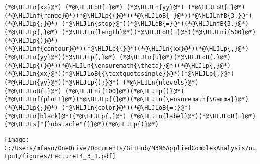 \documentclass[12pt,landscape]{article}
\newcommand{\HLJLn}[1]{#1}
\newcommand{\HLJLnf}[1]{\textcolor[RGB]{66,102,213}{#1}}
\newcommand{\HLJLs}[1]{\textcolor[RGB]{201,61,57}{#1}}
\newcommand{\HLJLnfB}[1]{\textcolor[RGB]{59,151,46}{#1}}
\newcommand{\HLJLni}[1]{\textcolor[RGB]{59,151,46}{#1}}
\newcommand{\HLJLoB}[1]{\textcolor[RGB]{102,102,102}{\textbf{#1}}}
\newcommand{\HLJLp}[1]{#1}
\def\cent#1{\begin{center}#1\end{center} }
\begin{document}
{\begin{lstlisting}
(*@\HLJLn{xx}@*) (*@\HLJLoB{=}@*) (*@\HLJLn{yy}@*) (*@\HLJLoB{=}@*) (*@\HLJLnf{range}@*)(*@\HLJLp{(}@*)(*@\HLJLoB{-}@*)(*@\HLJLnfB{3.}@*)(*@\HLJLp{;}@*) (*@\HLJLn{stop}@*)(*@\HLJLoB{=}@*)(*@\HLJLnfB{3.}@*)(*@\HLJLp{,}@*) (*@\HLJLn{length}@*)(*@\HLJLoB{=}@*)(*@\HLJLni{500}@*)(*@\HLJLp{)}@*)
(*@\HLJLnf{contour}@*)(*@\HLJLp{(}@*)(*@\HLJLn{xx}@*)(*@\HLJLp{,}@*) (*@\HLJLn{yy}@*)(*@\HLJLp{,}@*) (*@\HLJLn{u}@*)(*@\HLJLoB{.}@*)(*@\HLJLp{(}@*)(*@\HLJLn{\ensuremath{\theta}}@*)(*@\HLJLp{,}@*) (*@\HLJLn{xx}@*)(*@\HLJLoB{{\textquotesingle}}@*)(*@\HLJLp{,}@*)(*@\HLJLn{yy}@*)(*@\HLJLp{);}@*) (*@\HLJLn{nlevels}@*) (*@\HLJLoB{=}@*) (*@\HLJLni{100}@*)(*@\HLJLp{)}@*)
(*@\HLJLnf{plot!}@*)(*@\HLJLp{(}@*)(*@\HLJLn{\ensuremath{\Gamma}}@*)(*@\HLJLp{;}@*) (*@\HLJLn{color}@*)(*@\HLJLoB{=:}@*)(*@\HLJLn{black}@*)(*@\HLJLp{,}@*) (*@\HLJLn{label}@*)(*@\HLJLoB{=}@*)(*@\HLJLs{"{}obstacle"{}}@*)(*@\HLJLp{)}@*)
\end{lstlisting}

\cent{\texttt{[image: C:/Users/mfaso/OneDrive/Documents/GitHub/M3M6AppliedComplexAnalysis/output/figures/Lecture14\_3\_1.pdf]}}

}
\end{document}
